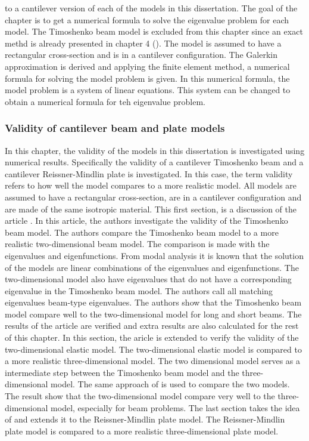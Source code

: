 \documentclass[../main.tex]{subfiles}
\begin{document}
to a cantilever version of each of the models in this dissertation. The goal of the chapter is to get a numerical formula to solve the eigenvalue problem for each model. The Timoshenko beam model is excluded from this chapter since an exact methd is already presented in chapter 4 (\cite{VV02}). The model is assumed to have a rectangular cross-section and is in a cantilever configuration. The Galerkin approximation is derived and applying the finite element method, a numerical formula for solving the model problem is given. In this numerical formula, the model problem is a system of linear equations. This system can be changed to obtain a numerical formula for teh eigenvalue problem.\\


\subsubsection{Validity of cantilever beam and plate models}

In this chapter, the validity of the models in this dissertation is investigated using numerical results. Specifically the validity of a cantilever Timoshenko beam and a cantilever Reissner-Mindlin plate is investigated. In this case, the term validity refers to how well the model compares to a more realistic model. All models are assumed to have a rectangular cross-section, are in a cantilever configuration and are made of the same isotropic material. This first section, is a discussion of the article \cite{LVV09}. In this article, the authors investigate the validity of the Timoshenko beam model. The authors compare the Timoshenko beam model to a more realistic two-dimensional beam model. The comparison is made with the eigenvalues and eigenfunctions. From modal analysis it is known that the solution of the models are linear combinations of the eigenvalues and eigenfunctions. The two-dimensional model also have eigenvalues that do not have a corresponding eigenvalue in the Timoshenko beam model. The authors call all matching eigenvalues beam-type eigenvalues. The authors show that the Timoshenko beam model compare well to the two-dimensional model for long and short beams. The results of the article are verified and extra results are also calculated for the rest of this chapter. In this section, the aricle \cite{LVV09} is extended to verify the validity of the two-dimensional elastic model. The two-dimensional elastic model is compared to a more realistic three-dimensional model. The two dimensional model serves as a intermediate step between the Timoshenko beam model and the three-dimensional model. The same approach of \cite{LVV09} is used to compare the two models. The result show that the two-dimensional model compare very well to the three-dimensional model, especially for beam problems. The last section takes the idea of \cite{LVV09} and extends it to the Reissner-Mindlin plate model. The Reissner-Mindlin plate model is compared to a more realistic three-dimensional plate model.\\
\end{document}
